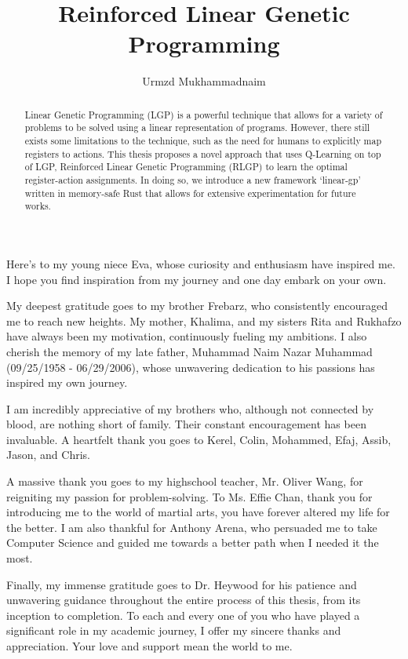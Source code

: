 \documentclass[12pt, final]{dalcsthesis}
\begin{document}
\bcshon
\title{Reinforced Linear Genetic Programming}
\author{Urmzd Mukhammadnaim}


\renewcommand{\listoflistings}{%
  \cleardoublepage
  \addcontentsline{toc}{chapter}{\listoflistingscaption}%
  \listof{listing}{\listoflistingscaption}%
}

\frontmatter
{}
\listofalgorithms
\listoflistings

\begin{abstract}
	Linear Genetic Programming (LGP) is a powerful technique that allows for a variety of problems to be solved using a linear representation of programs. However, there still exists some limitations to the technique, such as the need for humans to explicitly map registers to actions. This thesis proposes a novel approach that uses Q-Learning on top of LGP, Reinforced Linear Genetic Programming (RLGP) to learn the optimal register-action assignments. In doing so, we introduce a new framework `linear-gp' written in memory-safe Rust that allows for extensive experimentation for future works.
\end{abstract}

\begin{acknowledgements}
Here's to my young niece Eva, whose curiosity and enthusiasm have inspired me. I hope you find inspiration from my journey and one day embark on your own.

My deepest gratitude goes to my brother Frebarz, who consistently encouraged me to reach new heights.
My mother, Khalima, and my sisters Rita and Rukhafzo have always been my motivation, continuously fueling my ambitions.
I also cherish the memory of my late father, Muhammad Naim Nazar Muhammad (09/25/1958 - 06/29/2006), whose unwavering dedication to his passions has inspired my own journey.

I am incredibly appreciative of my brothers who, although not connected by blood, are nothing short of family.
Their constant encouragement has been invaluable.
A heartfelt thank you goes to Kerel, Colin, Mohammed, Efaj, Assib, Jason, and Chris.

A massive thank you goes to my highschool teacher, Mr. Oliver Wang, for reigniting my passion for problem-solving. 
To Ms. Effie Chan, thank you for introducing me to the world of martial arts, you have forever altered my life for the better.
I am also thankful for Anthony Arena, who persuaded me to take Computer Science and guided me towards a better path when I needed it the most.

Finally, my immense gratitude goes to Dr. Heywood for his patience and unwavering guidance throughout the entire process of this thesis, from its inception to completion. To each and every one of you who have played a significant role in my academic journey, I offer my sincere thanks and appreciation. Your love and support mean the world to me.
\end{acknowledgements}
\end{document}
